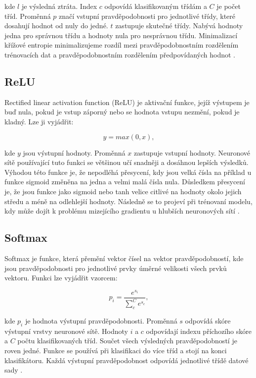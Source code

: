 \documentclass[FM,BP]{tulthesis}
\begin{document}
kde $ l $ je výsledná ztráta. Index $ c $ odpovídá klasifikovaným třídám a $ C $ je počet tříd. Proměnná $ p $ značí vstupní pravděpodobnosti pro jednotlivé třídy, které dosahují hodnot od nuly do jedné. $ t $ zastupuje skutečné třídy. Nabývá hodnoty jedna pro správnou třídu a hodnoty nula pro nesprávnou třídu. Minimalizací křížové entropie minimalizujeme rozdíl mezi pravděpodobnostním rozdělením trénovacích dat a pravděpodobnostním rozdělením předpovídaných hodnot \cite{brownlee_2020}.

\subsection{ReLU} %
Rectified linear activation function (ReLU) je aktivační funkce, jejíž výstupem je buď nula, pokud je vstup záporný nebo se hodnota vstupu nezmění, pokud je kladný. Lze ji vyjádřit:

\begin{equation}
\label{eqn:relu}
y = max(0, x),
\end{equation}

kde $ y $ jsou výstupní hodnoty. Proměnná $ x $ zastupuje vstupní hodnoty. Neuronové sítě používající tuto funkci se většinou učí snadněji a dosáhnou lepších výsledků. Výhodou této funkce je, že nepodléhá přesycení, kdy jsou velká čísla na příklad u funkce sigmoid změněna na jedna a velmi malá čísla nula. Důsledkem přesycení je, že jsou funkce jako sigmoid nebo tanh velice citlivé na hodnoty okolo jejich středu a méně na odlehlejší hodnoty. Následně se to projeví při trénovaní modelu, kdy může dojít k problému mizejícího gradientu u hlubších neuronových sítí \cite{brownlee_2020_ReLU}.

\subsection{Softmax} %
Softmax je funkce, která přemění vektor čísel na vektor pravděpodobností, kde jsou pravděpodobnosti pro jednotlivé prvky úměrné velikosti všech prvků vektoru. Funkci lze vyjádřit vzorcem:

\begin{equation}
\label{eqn:softmax}
p_i = \frac{e^{s_i}}{\sum_{c}^{C}e^{s_c}},
\end{equation}

kde $ p_i $ je hodnota výstupní pravděpodobnosti. Proměnná $ s $ odpovídá skóre výstupní vrstvy neuronové sítě. Hodnoty $ i $ a $ c $ odpovídají indexu příchozího skóre a $ C $ počtu klasifikovaných tříd. Součet všech výsledných pravděpodobností je roven jedné. Funkce se používá při klasifikaci do více tříd a stojí na konci klasifikátoru. Každá výstupní pravděpodobnost odpovídá jednotlivé třídě datové sady \cite{brownlee_2020_Softmax}.
\end{document}
